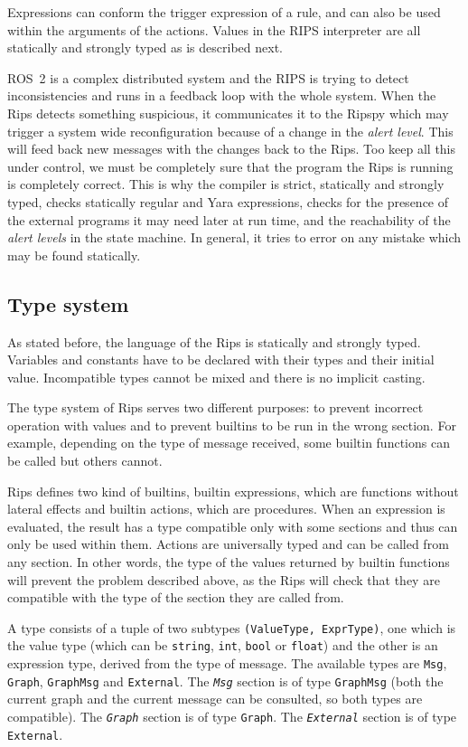 \documentclass[a4paper]{article}
\begin{document}
Expressions can conform the trigger expression of a
rule, and can also be used within the arguments of the actions. Values
in the RIPS interpreter are all statically and strongly typed as is described next.

ROS~2 is a complex distributed system and the RIPS is
trying to detect inconsistencies and runs in a feedback loop with
the whole system. When the Rips detects something suspicious, it communicates
it to the Ripspy which may
trigger a system wide reconfiguration because of a change in the
\emph{alert level}.  This will feed back new messages with the changes
back to the Rips. Too keep all this under control, we must be completely
sure that the program the Rips is running is completely correct. This is
why the compiler is strict, statically and strongly typed, checks statically  regular
and Yara expressions, checks for the presence of the external programs it may need
later at run time, and the reachability of the \emph{alert levels} in the state machine.
In general, it tries
to error on any mistake which may be found statically.

\subsection{Type system\label{sec:types}}
As stated before, the language of the Rips is statically and strongly typed.
Variables and constants have to be declared with their types and their initial value.
Incompatible types cannot be mixed and there is no implicit casting.

The type system of Rips serves two different purposes: to prevent incorrect
operation with values and to prevent builtins to be run in the wrong section.
For example, depending on the type of message received, some builtin
functions can be called but others cannot.

Rips defines two kind of builtins, builtin expressions, which are
functions without lateral effects and builtin actions, which are procedures.
When an expression is evaluated, the result has
a type compatible only with some sections and thus
can only be used within them. Actions are universally typed
and can be called from any section.
In other words, the type of the values returned by builtin functions will
prevent the problem described above, as the Rips will check that they
are compatible with the type
of the section they are called from.

A type consists of a tuple of two subtypes \verb+(ValueType, ExprType)+,
one which is the value type (which can be \texttt{string}, \texttt{int}, \texttt{bool}
or \texttt{float}) and the other is an expression type, derived from the
type of message. The available types are \texttt{Msg}, \texttt{Graph},
\texttt{GraphMsg} and \texttt{External}.  The \emph{\texttt{Msg}} section is of type
\texttt{GraphMsg} (both the current graph and the current message can be
consulted, so both types are compatible). The \emph{\texttt{Graph}} section is of type \texttt{Graph}.
The \emph{\texttt{External}} section is of type \texttt{External}.
\end{document}
